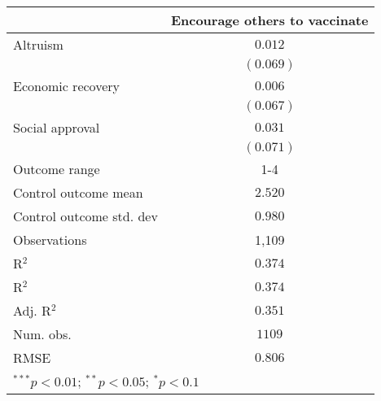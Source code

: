 
\begin{table}
\begin{center}
\begin{tabular}{l c}
\hline
 & Encourage others to vaccinate \\
\hline
Altruism                 & $0.012$   \\
                         & $(0.069)$ \\
Economic recovery        & $0.006$   \\
                         & $(0.067)$ \\
Social approval          & $0.031$   \\
                         & $(0.071)$ \\
\hline
Outcome range            & 1-4       \\
Control outcome mean     & $2.520$   \\
Control outcome std. dev & $0.980$   \\
Observations             & 1,109     \\
R$^{2}$                  & $0.374$   \\
R$^2$                    & $0.374$   \\
Adj. R$^2$               & $0.351$   \\
Num. obs.                & $1109$    \\
RMSE                     & $0.806$   \\
\hline
\multicolumn{2}{l}{\scriptsize{$^{***}p<0.01$; $^{**}p<0.05$; $^{*}p<0.1$}}
\end{tabular}
\caption{}
\label{table:Tables and Figures/SI_table23_motiv_Argentina_encourage1-4}
\end{center}
\end{table}
